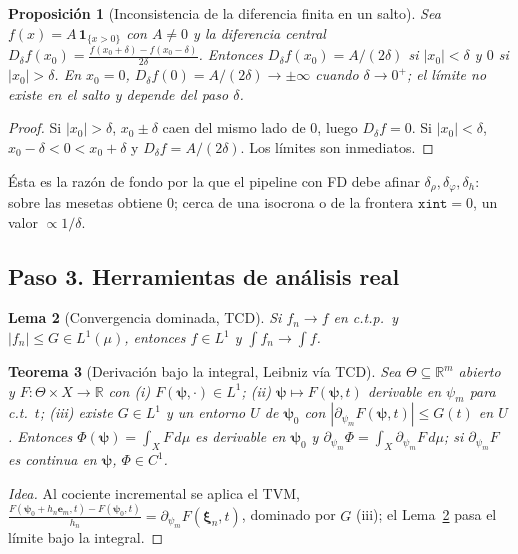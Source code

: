 \documentclass[11pt,a4paper]{article}
\theoremstyle{plain}
\newtheorem{theorem}{Teorema}
\newtheorem{lemma}[theorem]{Lema}
\newtheorem{proposition}[theorem]{Proposici\'on}
\theoremstyle{definition}
\newcommand{\vect}[1]{\boldsymbol{#1}}
\newcommand{\R}{\mathbb{R}}
\newcommand{\abs}[1]{\left\lvert #1 \right\rvert}
\begin{document}
\begin{proposition}[Inconsistencia de la diferencia finita en un salto]\label{prop:fd}
Sea $f(x)=A\,\mathbf{1}_{\{x>0\}}$ con $A\neq0$ y la diferencia central
$D_\delta f(x_0)=\frac{f(x_0+\delta)-f(x_0-\delta)}{2\delta}$. Entonces
$D_\delta f(x_0)=A/(2\delta)$ si $\abs{x_0}<\delta$ y $0$ si $\abs{x_0}>\delta$.
En $x_0=0$, $D_\delta f(0)=A/(2\delta)\to\pm\infty$ cuando $\delta\to0^+$; el
l\'imite no existe en el salto y \emph{depende del paso} $\delta$.
\end{proposition}
\begin{proof}
Si $\abs{x_0}>\delta$, $x_0\pm\delta$ caen del mismo lado de $0$, luego
$D_\delta f=0$. Si $\abs{x_0}<\delta$, $x_0-\delta<0<x_0+\delta$ y
$D_\delta f=A/(2\delta)$. Los l\'imites son inmediatos.
\end{proof}

\'Esta es la raz\'on de fondo por la que el pipeline con FD debe afinar
$\delta_\rho,\delta_\varphi,\delta_h$: sobre las mesetas obtiene $0$; cerca de una
isocrona o de la frontera $\texttt{xint}=0$, un valor $\propto1/\delta$.

\subsection*{Paso 3. Herramientas de an\'alisis real}
\label{sec:herramientas}

\begin{lemma}[Convergencia dominada, TCD]\label{lem:tcd}
Si $f_n\to f$ en c.t.p.\ y $\abs{f_n}\le G\in L^1(\mu)$, entonces $f\in L^1$ y
$\int f_n\to\int f$.
\end{lemma}

\begin{theorem}[Derivaci\'on bajo la integral, Leibniz v\'ia TCD]\label{thm:leibniz}
Sea $\Theta\subseteq\R^m$ abierto y $F:\Theta\times X\to\R$ con (i)
$F(\vect{\psi},\cdot)\in L^1$; (ii) $\vect{\psi}\mapsto F(\vect{\psi},t)$
derivable en $\psi_m$ para c.t.\ $t$; (iii) existe $G\in L^1$ y un entorno $U$ de
$\vect{\psi}_0$ con $\abs{\partial_{\psi_m}F(\vect{\psi},t)}\le G(t)$ en $U$.
Entonces $\Phi(\vect{\psi})=\int_X F\,d\mu$ es derivable en $\vect{\psi}_0$ y
$\partial_{\psi_m}\Phi=\int_X\partial_{\psi_m}F\,d\mu$; si $\partial_{\psi_m}F$ es
continua en $\vect{\psi}$, $\Phi\in C^1$.
\end{theorem}
\begin{proof}[Idea]
Al cociente incremental se aplica el TVM,
$\frac{F(\vect{\psi}_0+h_n\vect e_m,t)-F(\vect{\psi}_0,t)}{h_n}
=\partial_{\psi_m}F(\vect{\xi}_n,t)$, dominado por $G$ (iii); el
Lema~\ref{lem:tcd} pasa el l\'imite bajo la integral.
\end{proof}
\end{document}
